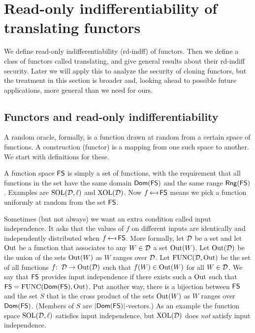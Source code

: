 
\section{Read-only indifferentiability of translating functors}\label{sec-cc-indiff}

We define read-only indifferentiability (rd-indff) of functors. Then we define a class of functors called translating, and give general results about their rd-indiff security. Later we will apply this to analyze the security of cloning functors, but the treatment in this section is broader and, looking ahead to possible future applications, more general than we need for ours.



\subsection{Functors and read-only indifferentiability} 

A random oracle, formally, is a function drawn at random from a certain space of functions. A construction (functor) is a mapping from one such space to another. We start with definitions for these.

 A function space $\mathsf{FS}$ is simply a set of functions, with the requirement that all functions in the set have the same domain $\mathsf{Dom}(\mathsf{FS})$ and the same range $\mathsf{Rng}(\mathsf{FS})$. Examples are $\mathrm{SOL}(\mathcal{D},\ell)$ and $\mathrm{XOL}(\mathcal{D})$. Now $f\getsr\roSp$ means we pick a function uniformly at random from the set $\mathsf{FS}$. 

Sometimes (but not always) we want an extra condition called input independence. It asks that the values of $f$ on different inputs are identically and independently distributed when $f\getsr\roSp$. More formally, let $\mathcal{D}$ be a set and let $\mathrm{Out}$ be a function that associates to any $W \in \mathcal{D}$ a set $\mathrm{Out}(W)$. Let $\mathrm{Out}(\mathcal{D})$ be the union of the sets $\mathrm{Out}(W)$ as $W$ ranges over $\mathcal{D}$. Let $\mathrm{FUNC}(\mathcal{D},\mathrm{Out})$ be the set of all functions $f{:\;\;}\mathcal{D}\to\mathrm{Out}(\mathcal{D})$ such that $f(W)\in \mathrm{Out}(W)$ for all $W\in\mathcal{D}$. We say that $\mathsf{FS}$ provides input independence if there exists such a $\mathrm{Out}$ such that $\mathsf{FS} = \mathrm{FUNC}(\mathsf{Dom}(\mathsf{FS}),\mathrm{Out})$. Put another way, there is a bijection between $\mathsf{FS}$ and the set $S$ that is the cross product of the sets $\mathrm{Out}(W)$ as $W$ ranges over $\mathsf{Dom}(\mathsf{FS})$. (Members of $S$ are $|\mathsf{Dom}(\mathsf{FS})|$-vectors.) As an example the function space $\mathrm{SOL}(\mathcal{D},\ell)$ satisfies input independence, but $\mathrm{XOL}(\mathcal{D})$ does \textit{not} satisfy input independence.

